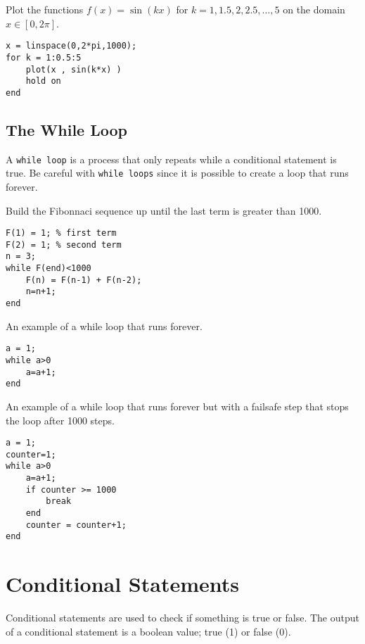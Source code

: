 \begin{example}
    Plot the functions $f(x) = \sin(kx)$ for $k=1, 1.5, 2, 2.5, \ldots, 5$ on the domain $x \in
    [0,2\pi]$.
\begin{lstlisting}
x = linspace(0,2*pi,1000);
for k = 1:0.5:5
    plot(x , sin(k*x) )
    hold on
end
\end{lstlisting}
\end{example}




\subsection{The While Loop}
A \texttt{while loop} is a process that only repeats while a conditional statement is
true.  Be careful with \texttt{while loops} since it is possible to create a loop that
runs forever.

\begin{example}
    Build the Fibonnaci sequence up until the last term is greater than 1000.
\begin{lstlisting}
F(1) = 1; % first term
F(2) = 1; % second term
n = 3;
while F(end)<1000
    F(n) = F(n-1) + F(n-2);
    n=n+1;
end
\end{lstlisting}
\end{example}

\begin{example}
    An example of a while loop that runs forever.
\begin{lstlisting}
a = 1;
while a>0
    a=a+1;
end
\end{lstlisting}
\end{example}


\begin{example}
    An example of a while loop that runs forever but with a failsafe step that stops the
    loop after 1000 steps.
\begin{lstlisting}
a = 1;
counter=1;
while a>0
    a=a+1;
    if counter >= 1000
        break
    end
    counter = counter+1;
end
\end{lstlisting}
\end{example}

\section{Conditional Statements}
Conditional statements are used to check if something is true or false.  The output of a
conditional statement is a boolean value; true (1) or false (0).  


